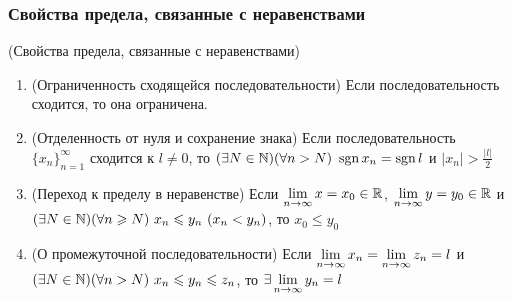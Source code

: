 \subsubsection*{Свойства предела, связанные с неравенствами}

\begin{theorem}(Свойства предела, связанные с неравенствами)

	\begin{enumerate}
		\item (Ограниченность сходящейся последовательности) Если
        последовательность сходится, то она ограничена.
		
		\item (Отделенность от нуля и сохранение знака) Если
        последовательность $\{x_n\}_{n = 1}^\infty$ сходится к
        $l \neq 0$, то $(\exists N \in \mathbb{N})(\forall n > N)\ \operatorname{sgn} x_n
        = \operatorname{sgn} l$ и $|x_n| > \frac{|l|}{2}$
		
		\item (Переход к пределу в неравенстве) Если 
        $\lim\limits_{n \to \infty} x = x_0 \in \mathbb{R}$, $\lim\limits_{n \to \infty}
        y = y_0 \in \mathbb{R}$ и $(\exists N \in \N)(\forall n \ge N)\ x_n \le y_n \ 
        (x_n < y_n)$, то $x_0 \le y_0$
		
		\item (О промежуточной последовательности) Если 
        $\lim\limits_{n \to \infty} x_n = \lim\limits_{n \to \infty} z_n = l$ и
        $(\exists N \in \mathbb{N})(\forall n > N)\ x_n \leqslant y_n \leqslant z_n$, то
        $\exists \lim\limits_{n \to \infty} y_n = l$
	\end{enumerate}
\end{theorem}

